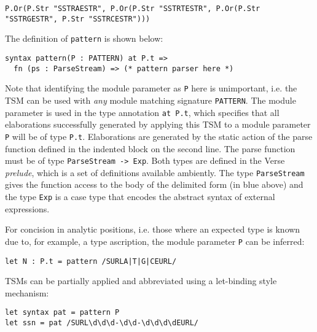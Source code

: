 \begin{lstlisting}[numbers=none]
P.Or(P.Str "SSTRAESTR", P.Or(P.Str "SSTRTESTR", P.Or(P.Str "SSTRGESTR", P.Str "SSTRCESTR")))
\end{lstlisting}

The definition of \lstinline{pattern} is shown below:
\begin{lstlisting}[numbers=none]
syntax pattern(P : PATTERN) at P.t => 
  fn (ps : ParseStream) => (* pattern parser here *)
\end{lstlisting}
Note that identifying the module parameter as \lstinline{P} here is unimportant, i.e. the TSM can be used with \emph{any} module matching signature \lstinline{PATTERN}. The module parameter is used in the type annotation \lstinline{at P.t}, which specifies that all elaborations successfully generated by applying this TSM to a module parameter \lstinline{P} will be of type \lstinline{P.t}. Elaborations are generated by the static action of the parse function defined in the indented block on the second line. The parse function must be of type \lstinline{ParseStream -> Exp}.  Both types are defined in the Verse \emph{prelude}, which is a set of definitions available ambiently. The type \lstinline{ParseStream} gives the function access to the {body} of the delimited form (in blue above) and the type \lstinline{Exp} is a case type that encodes the abstract syntax of external expressions.

For concision in analytic positions, i.e. those where an expected type is known due to, for example, a type ascription, the module parameter \lstinline{P} can be inferred:
\begin{lstlisting}[numbers=none]
let N : P.t = pattern /SURLA|T|G|CEURL/
\end{lstlisting}

TSMs can be partially applied and abbreviated using a let-binding style mechanism:
\begin{lstlisting}[numbers=none]
let syntax pat = pattern P 
let ssn = pat /SURL\d\d\d-\d\d-\d\d\d\dEURL/
\end{lstlisting}

